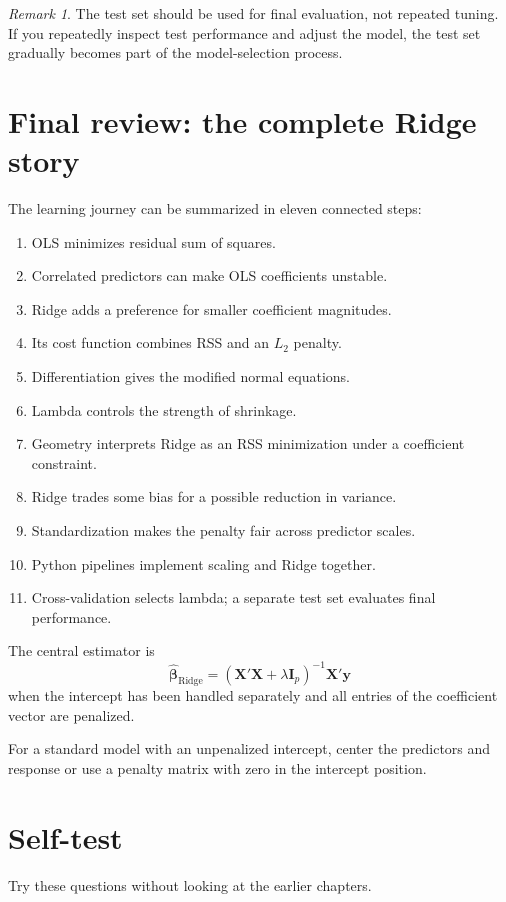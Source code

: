 \documentclass[11pt,a4paper,oneside]{book}
\theoremstyle{remark}
\newtheorem{remark}{Remark}[chapter]
\newcommand{\X}{\mathbf X}
\newcommand{\y}{\mathbf y}
\newcommand{\I}{\mathbf I}
\newcommand{\bhat}{\widehat{\boldsymbol{\beta}}}
\begin{document}
\begin{remark}
The test set should be used for final evaluation, not repeated tuning.
If you repeatedly inspect test performance and adjust the model, the test
set gradually becomes part of the model-selection process.
\end{remark}

\chapter*{Final review: the complete Ridge story}

The learning journey can be summarized in eleven connected steps:
\begin{enumerate}
\item OLS minimizes residual sum of squares.
\item Correlated predictors can make OLS coefficients unstable.
\item Ridge adds a preference for smaller coefficient magnitudes.
\item Its cost function combines RSS and an $L_2$ penalty.
\item Differentiation gives the modified normal equations.
\item Lambda controls the strength of shrinkage.
\item Geometry interprets Ridge as an RSS minimization under a coefficient constraint.
\item Ridge trades some bias for a possible reduction in variance.
\item Standardization makes the penalty fair across predictor scales.
\item Python pipelines implement scaling and Ridge together.
\item Cross-validation selects lambda; a separate test set evaluates final performance.
\end{enumerate}

The central estimator is
\[
\boxed{
\bhat_{\mathrm{Ridge}}
=(\X'\X+\lambda\I_p)^{-1}\X'\y
}
\]
when the intercept has been handled separately and all entries of the
coefficient vector are penalized.

For a standard model with an unpenalized intercept, center the predictors
and response or use a penalty matrix with zero in the intercept position.

\chapter*{Self-test}
Try these questions without looking at the earlier chapters.
\end{document}
